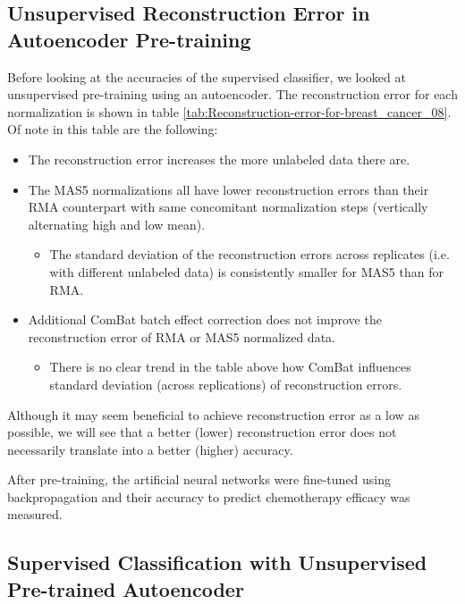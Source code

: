 \subsection{Unsupervised Reconstruction Error in Autoencoder Pre-training}

Before looking at the accuracies of the supervised classifier, we
looked at unsupervised pre-training using an autoencoder. The reconstruction
error for each normalization is shown in table \ref{tab:Reconstruction-error-for-breast_cancer_08}.
Of note in this table are the following:
\begin{itemize}
\item The reconstruction error increases the more unlabeled data there are.
\item The MAS5 normalizations all have lower reconstruction errors than
their RMA counterpart with same concomitant normalization steps (vertically
alternating high and low mean).

\begin{itemize}
\item The standard deviation of the reconstruction errors across replicates
(i.e. with different unlabeled data) is consistently smaller for MAS5
than for RMA.
\end{itemize}
\item Additional ComBat batch effect correction does not improve the reconstruction
error of RMA or MAS5 normalized data.

\begin{itemize}
\item There is no clear trend in the table above how ComBat influences standard
deviation (across replications) of reconstruction errors.
\end{itemize}
\end{itemize}
Although it may seem beneficial to achieve reconstruction error as
a low as possible, we will see that a better (lower) reconstruction
error does not necessarily translate into a better (higher) accuracy.

After pre-training, the artificial neural networks were fine-tuned
using backpropagation and their accuracy to predict chemotherapy efficacy
was measured.

\subsection{Supervised Classification with Unsupervised Pre-trained Autoencoder}

